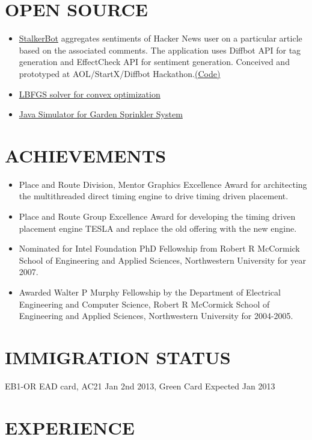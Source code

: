 \documentclass[margin]{res}
\begin{document}
\begin{resume}
\section{OPEN SOURCE}
\begin{itemize} \itemsep -2pt
\item \href{www.stalkerbot.com}{StalkerBot} aggregates sentiments of Hacker News 
  user on a particular article based on the associated comments. 
  The application uses Diffbot API for tag generation and EffectCheck API for
  sentiment generation. Conceived and prototyped at AOL/StartX/Diffbot
  Hackathon.\href{https://github.com/debasish83/StalkerBot}{(Code)}
\item \href{https://github.com/debasish83/liblbfgs}{LBFGS solver for convex optimization}
\item \href{https://github.com/debasish83/sprinklersystem}{Java Simulator for
  Garden Sprinkler System}
\end{itemize}

\section{ACHIEVEMENTS}
\begin{itemize} \itemsep -2pt
\item Place and Route Division, Mentor Graphics Excellence Award for architecting the multithreaded direct timing engine to drive timing driven placement.
\item Place and Route Group Excellence Award for developing the timing driven placement engine TESLA and replace the old offering with the new engine.  
\item Nominated for Intel Foundation PhD Fellowship from Robert R McCormick School of Engineering and Applied Sciences, Northwestern University for year 2007.
\item Awarded Walter P Murphy Fellowship by the Department of Electrical Engineering and Computer Science, Robert R McCormick School of Engineering and Applied 
  Sciences, Northwestern University for 2004-2005.
\end{itemize}

\section{IMMIGRATION STATUS}
EB1-OR EAD card, AC21 Jan 2nd 2013, Green Card Expected Jan 2013

\section{EXPERIENCE}


\end{resume}
\end{document}
